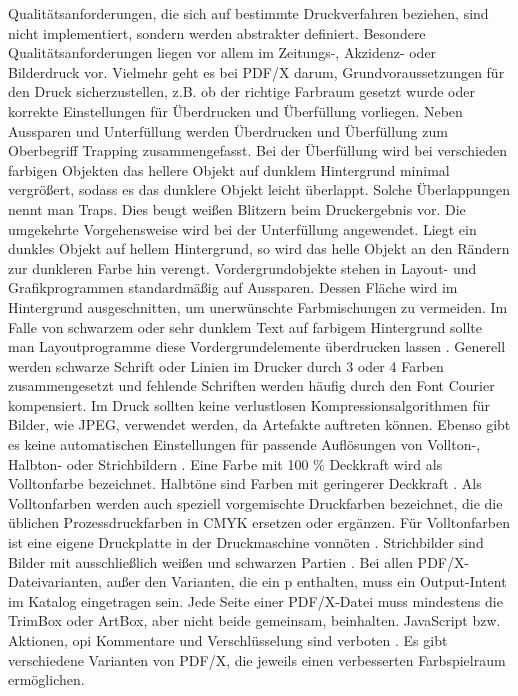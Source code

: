 Qualitätsanforderungen, die sich auf bestimmte Druckverfahren beziehen, sind nicht implementiert, sondern werden abstrakter definiert. Besondere Qualitätsanforderungen liegen vor allem im Zeitungs-, Akzidenz- oder Bilderdruck vor. Vielmehr geht es bei PDF/X darum, Grundvoraussetzungen für den Druck sicherzustellen, z.B. ob der richtige Farbraum gesetzt wurde oder korrekte Einstellungen für Überdrucken und Überfüllung vorliegen. Neben Aussparen und Unterfüllung werden Überdrucken und Überfüllung zum Oberbegriff Trapping zusammengefasst. Bei der Überfüllung wird bei verschieden farbigen Objekten das hellere Objekt auf dunklem Hintergrund minimal vergrößert, sodass es das dunklere Objekt leicht überlappt. Solche Überlappungen nennt man Traps. Dies beugt weißen Blitzern beim Druckergebnis vor. Die umgekehrte Vorgehensweise wird bei der Unterfüllung angewendet. Liegt ein dunkles Objekt auf hellem Hintergrund, so wird das helle Objekt an den Rändern zur dunkleren Farbe hin verengt. Vordergrundobjekte stehen in Layout- und Grafikprogrammen standardmäßig auf Aussparen. Dessen Fläche wird im Hintergrund ausgeschnitten, um unerwünschte Farbmischungen zu vermeiden. Im Falle von schwarzem oder sehr dunklem Text auf farbigem Hintergrund sollte man Layoutprogramme diese Vordergrundelemente überdrucken lassen \cite{kompendium}. Generell werden schwarze Schrift oder Linien im Drucker durch 3 oder 4 Farben zusammengesetzt und fehlende Schriften werden häufig durch den Font Courier kompensiert. Im Druck sollten keine verlustlosen Kompressionsalgorithmen für Bilder, wie JPEG, verwendet werden, da Artefakte auftreten können. Ebenso gibt es keine automatischen Einstellungen für passende Auflösungen von Vollton-, Halbton- oder Strichbildern \cite{adobe-pdf-x}. Eine Farbe mit 100 \% Deckkraft wird als Volltonfarbe bezeichnet. Halbtöne sind Farben mit geringerer Deckkraft \cite{halb-voll}. Als Volltonfarben werden auch speziell vorgemischte Druckfarben bezeichnet, die die üblichen Prozessdruckfarben in CMYK ersetzen oder ergänzen. Für Volltonfarben ist eine eigene Druckplatte in der Druckmaschine vonnöten \cite{adobe-voll}. Strichbilder sind Bilder mit ausschließlich weißen und schwarzen Partien \cite{strich}. Bei allen PDF/X-Dateivarianten, außer den Varianten, die ein p enthalten, muss ein Output-Intent im Katalog eingetragen sein. Jede Seite einer PDF/X-Datei muss mindestens die TrimBox oder ArtBox, aber nicht beide gemeinsam, beinhalten. JavaScript bzw. Aktionen, \gls{opi} Kommentare und Verschlüsselung sind verboten \cite{schneeberger}. Es gibt verschiedene Varianten von PDF/X, die jeweils einen verbesserten Farbspielraum ermöglichen. 

